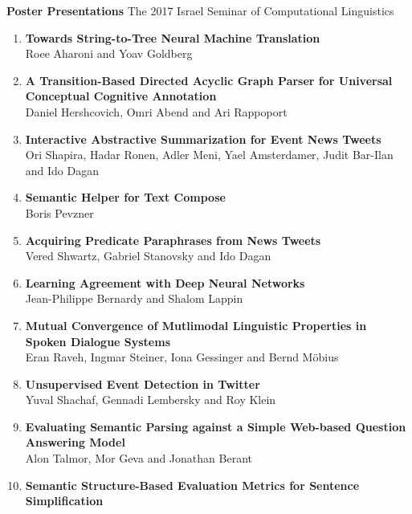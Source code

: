 \documentclass[a0,portrait]{a0poster}
\begin{document}
    \pagebreak

    {\fontsize{70pt}{70pt}\selectfont\textbf{Poster Presentations}}
    \hfill
    {\huge The 2017 Israel Seminar of Computational Linguistics}
    \vspace{50pt}

    {\LARGE
    \begin{enumerate}\setlength\itemsep{10pt}
        \item
        \textbf{Towards String-to-Tree Neural Machine Translation}\\
        Roee Aharoni and Yoav Goldberg
        \item
        \textbf{A Transition-Based Directed Acyclic Graph Parser for Universal
        Conceptual Cognitive Annotation}\\
        Daniel Hershcovich, Omri Abend and Ari Rappoport
        \item
        \textbf{Interactive Abstractive Summarization for Event News Tweets}\\
        Ori Shapira, Hadar Ronen, Adler Meni, Yael Amsterdamer, Judit Bar-Ilan
        and Ido Dagan
        \item
        \textbf{Semantic Helper for Text Compose}\\
        Boris Pevzner
        \item
        \textbf{Acquiring Predicate Paraphrases from News Tweets}\\
        Vered Shwartz, Gabriel Stanovsky and Ido Dagan
        \item
        \textbf{Learning Agreement with Deep Neural Networks}\\
        Jean-Philippe Bernardy and Shalom Lappin
        \item
        \textbf{Mutual Convergence of Mutlimodal Linguistic Properties in
        Spoken Dialogue Systems}\\
        Eran Raveh, Ingmar Steiner, Iona Gessinger and Bernd M\"obius
        \item
        \textbf{Unsupervised Event Detection in Twitter}\\
        Yuval Shachaf, Gennadi Lembersky and Roy Klein
        \item
        \textbf{Evaluating Semantic Parsing against a Simple Web-based
        Question Answering Model}\\
        Alon Talmor, Mor Geva and Jonathan Berant
        \item
        \textbf{Semantic Structure-Based Evaluation Metrics for Sentence
        Simplification}\\

\end{enumerate}}
\end{document}
